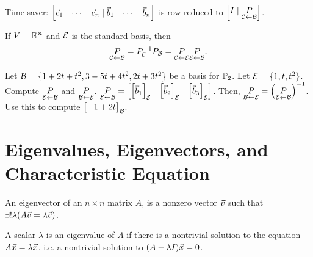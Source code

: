 \documentclass[10pt,a4paper]{article}
\begin{document}
Time saver: $\begin{bmatrix}\vec{c}_1 & \cdots & \vec{c}_n \mid \vec{b}_1 & \cdots & \vec{b}_n\end{bmatrix}$ is row reduced to $\begin{bmatrix}I \mid \underset{\mathcal{C}\leftarrow \mathcal{B}}P\end{bmatrix}$.
\begin{remark}
	If $V = \mathbb{R}^n$ and $\mathcal{E}$ is the standard basis, then $$\underset{\mathcal{C}\leftarrow \mathcal{B}}P = P^{-1}_{\mathcal{C}} P_{\mathcal{B}} = \underset{\mathcal{C}\leftarrow \mathcal{E}}P \underset{\mathcal{E}\leftarrow \mathcal{B}}P.$$
\end{remark}
 
\begin{example}
	Let $\mathcal{B} = \{1 + 2t + t^2,3-5t+4t^2,2t+3t^2\}$ be a basis for $\mathbb{P}_2$. Let $\mathcal{E} = \{1,t,t^2\}$. Compute $\underset{\mathcal{E} \leftarrow \mathcal{B}}{P}$ and $\underset{\mathcal{B}\leftarrow \mathcal{E}}{P}$.
	$\underset{\mathcal{E} \leftarrow \mathcal{B}}{P} = \begin{bmatrix}\begin{bmatrix}\vec{b}_1\end{bmatrix}_{\mathcal{E}} &\begin{bmatrix}\vec{b}_2\end{bmatrix}_{\mathcal{E}} & \begin{bmatrix}\vec{b}_3\end{bmatrix}_{\mathcal{E}}\end{bmatrix}$. Then, $\underset{\mathcal{B} \leftarrow \mathcal{E}}{P} = \left( \underset{\mathcal{E} \leftarrow \mathcal{B}}{P} \right)^{-1}$.
	Use this to compute $\begin{bmatrix}-1 + 2t\end{bmatrix}_{\mathcal{B}}$.
	
\end{example}

\newpage

\section{Eigenvalues, Eigenvectors, and Characteristic Equation}

\begin{definition}
	An eigenvector of an $n\times n$ matrix $A$, is a nonzero vector $\vec{v}$ such that $\exists ! \lambda (A\vec{v} = \lambda \vec{v})$.
\end{definition}
\begin{definition}
	A scalar $\lambda$ is an eigenvalue of $A$ if there is a nontrivial solution to the equation $A\vec{x} = \lambda \vec{x}$. i.e. a nontrivial solution to $(A-\lambda I)\vec{x} = 0$.
\end{definition}
\end{document}
